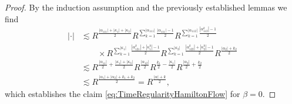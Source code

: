 \documentclass{amsart}
\theoremstyle{definition}
\begin{document}
\begin{proof}
By the induction assumption and the previously established lemmas we find
\begin{equation*}
\begin{split}
| \cdot | &\lesssim R^{\frac{|\alpha_{111}| + |\kappa_1| + |\kappa_3|}{2}} R^{\sum_{k=1}^{|\alpha_{111}|} \frac{|\alpha_{111}|-1}{2}} R^{\sum_{k=1}^{|\alpha_{112}|} \frac{|\alpha_{112}^k|-1}{2} } \\
&\quad \quad \times R^{\sum_{k=1}^{|\kappa_1|} \frac{|\alpha_{121}^k| + |\kappa_1^k| - 1}{2}} R^{\sum_{k=1}^{|\kappa_2|} \frac{|\alpha_{122}^k| + |\kappa_2^k| - 1}{2}} R^{\frac{|\alpha_2| + k_2}{2}} \\
&\lesssim R^{\frac{|\alpha_{11}|}{2} + \frac{|\kappa_1|+ |\kappa_3|}{2}} R^{\frac{|\alpha_{12}|}{2}} R^{\frac{k_1}{2}-\frac{|\kappa_1|}{2}} R^{\frac{|\alpha_2|}{2}+\frac{k_2}{2}} \\
&\lesssim R^{\frac{|\alpha_1| + |\alpha_2| + k_1 + k_2}{2}} = R^{\frac{|\alpha| + k}{2}},
\end{split}
\end{equation*}
which establishes the claim \eqref{eq:TimeRegularityHamiltonFlow} for $\beta  =0$.


\end{proof}
\end{document}
